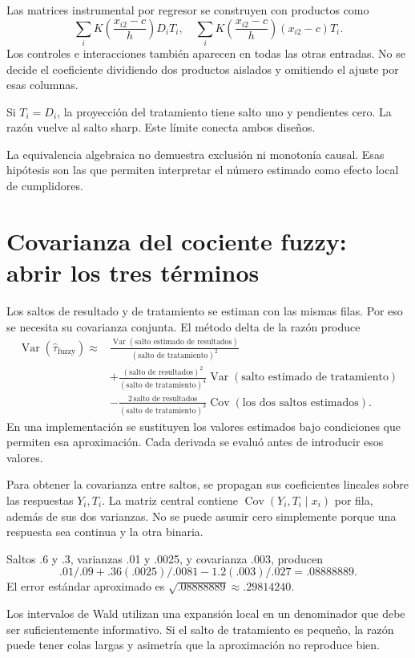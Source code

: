 \documentclass[11pt,a4paper]{article}
\DeclareMathOperator{\Var}{Var}
\DeclareMathOperator{\Cov}{Cov}
\begin{document}
Las matrices instrumental por regresor
se construyen con productos como
\[
\sum_i K\left(\frac{x_{i2}-c}{h}\right)D_iT_i,
\quad
\sum_i K\left(\frac{x_{i2}-c}{h}\right)(x_{i2}-c)T_i.
\]
Los controles e interacciones también
aparecen en todas las otras entradas.
No se decide el coeficiente dividiendo
dos productos aislados y omitiendo
el ajuste por esas columnas.

\begin{ejemplo}
Si \(T_i=D_i\), la proyección del tratamiento
tiene salto uno y pendientes cero.
La razón vuelve al salto sharp.
Este límite conecta ambos diseños.
\end{ejemplo}
La equivalencia algebraica no demuestra
exclusión ni monotonía causal.
Esas hipótesis son las que permiten
interpretar el número estimado como
efecto local de cumplidores.

\clearpage
\section{Covarianza del cociente fuzzy: abrir los tres términos}\label{unidad45}
Los saltos de resultado y de tratamiento
se estiman con las mismas filas.
Por eso se necesita su covarianza conjunta.
El método delta de la razón produce
\[
\begin{aligned}
\Var(\widehat\tau_{\mathrm{fuzzy}})
\approx&
\frac{\Var(\text{salto estimado de resultados})}
{(\text{salto de tratamiento})^2}\\
&+\frac{(\text{salto de resultados})^2}
{(\text{salto de tratamiento})^4}
\Var(\text{salto estimado de tratamiento})\\
&-\frac{2\,\text{salto de resultados}}
{(\text{salto de tratamiento})^3}
\Cov(\text{los dos saltos estimados}).
\end{aligned}
\]
En una implementación se sustituyen
los valores estimados bajo condiciones
que permiten esa aproximación.
Cada derivada se evaluó antes de
introducir esos valores.

Para obtener la covarianza entre saltos,
se propagan sus coeficientes lineales
sobre las respuestas \(Y_i,T_i\).
La matriz central contiene
\(\Cov(Y_i,T_i\mid x_i)\) por fila,
además de sus dos varianzas.
No se puede asumir cero simplemente
porque una respuesta sea continua
y la otra binaria.

\begin{ejemplo}
Saltos .6 y .3, varianzas .01 y .0025,
y covarianza .003, producen
\[
.01/.09+.36(.0025)/.0081-1.2(.003)/.027
=.08888889.
\]
El error estándar aproximado es
\(\sqrt{.08888889}\approx.29814240\).
\end{ejemplo}
Los intervalos de Wald utilizan
una expansión local en un denominador
que debe ser suficientemente informativo.
Si el salto de tratamiento es pequeño,
la razón puede tener colas largas
y asimetría que la aproximación
no reproduce bien.
\end{document}

